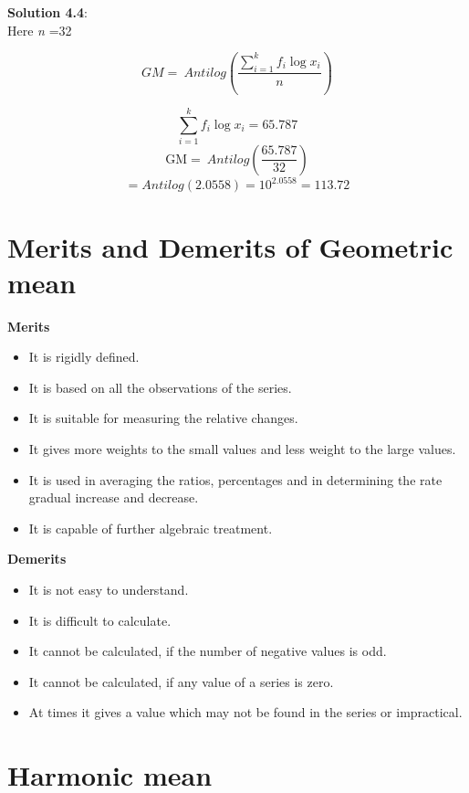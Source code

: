 \documentclass[
]{book}
\begin{document}
\textbf{Solution 4.4}:\\
Here \emph{n} =32

\[GM = \ Antilog\left( \frac{\sum_{i = 1}^{k}{{f_{i}\log}x_{i}}}{n} \right)\]

\[{\sum_{i = 1}^{k}{{f_{i}\log}x_{i}} = 65.787}\]
\[{\text{GM} = \ Antilog\left( \frac{65.787}{32} \right)}\]
\[{= Antilog\left( 2.0558 \right) = 10^{2.0558} = 113.72}\]

\hypertarget{merits-and-demerits-of-geometric-mean}{%
\section{Merits and Demerits of Geometric mean}\label{merits-and-demerits-of-geometric-mean}}

{\textbf{Merits}}

\begin{itemize}
\item
  It is rigidly defined.
\item
  It is based on all the observations of the series.
\item
  It is suitable for measuring the relative changes.
\item
  It gives more weights to the small values and less weight to the
  large values.
\item
  It is used in averaging the ratios, percentages and in determining
  the rate gradual increase and decrease.
\item
  It is capable of further algebraic treatment.
\end{itemize}

{\textbf{Demerits}}

\begin{itemize}
\item
  It is not easy to understand.
\item
  It is difficult to calculate.
\item
  It cannot be calculated, if the number of negative values is odd.
\item
  It cannot be calculated, if any value of a series is zero.
\item
  At times it gives a value which may not be found in the series or
  impractical.
\end{itemize}

\hypertarget{harmonic-mean}{%
\section{Harmonic mean}\label{harmonic-mean}}
\end{document}

